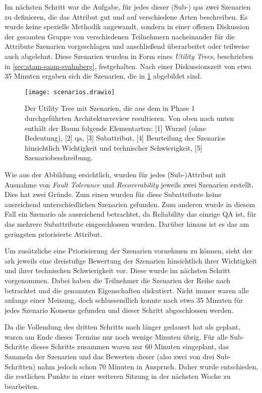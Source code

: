 Im nächsten Schritt war die Aufgabe, für jedes dieser (Sub-) \glspl{qa} zwei Szenarien zu definieren, die das Attribut gut und auf verschiedene Arten beschreiben.
Es wurde keine spezielle Methodik an\-ge\-wandt, sondern in einer offenen Diskussion der gesamten Gruppe von verschiedenen Teil\-neh\-mern nacheinander für die Attribute Szenarien vorgeschlagen und anschließend überarbeitet oder teilweise auch abgelehnt.
Diese Szenarien wurden in Form eines \emph{Utility Trees}, beschrieben in \cref{sec:atam-saam-svahnberg}, festgehalten.
Nach einer Diskussionszeit von etwa 35 Minuten ergaben sich die Szenarien, die in  \cref{fig:scenarios} abgebildet sind.

\begin{figure}
	\centering
	\texttt{[image: scenarios.drawio]}
	\caption[Utility Tree des Architekturreviews mit  und Szenarien]{
		Der Utility Tree mit Szenarien, die aus dem in Phase 1 durchgeführten Architekturreview resultieren.
		Von oben nach unten enthält der Baum folgende Elementarten: [1] Wurzel (ohne Bedeutung), [2] \gls{qa}, [3] Subattribut, [4] Be\-ur\-teilung des Szenarios hinsichtlich Wichtigkeit und technischer Schwierigkeit, [5] Szenariobeschreibung.
	}
	\label{fig:scenarios}
\end{figure}

Wie aus der Abbildung ersichtlich, wurden für jedes (Sub-)Attribut mit Ausnahme von \emph{Fault Tolerance} und \emph{Recoverability} jeweils zwei Szenarien erstellt.
Dies hat zwei Gründe.
Zum einen wurden für diese Subattribute keine ausreichend unterschiedlichen Szenarien gefunden.
Zum anderen wurde in diesem Fall ein Szenario als ausreichend betrachtet, da Reliability das einzige QA ist, für das mehrere Subattribute eingeschlossen wurden.
Darüber hinaus ist es das am geringsten priorisierte Attribut.

Um zusätzliche eine Priorisierung der Szenarien vornehmen zu können, sieht der \gls{arh} jeweils eine dreistufige Bewertung der Szenarien hinsichtlich ihrer Wichtigkeit und ihrer technischen Schwierigkeit vor.
Diese wurde im nächsten Schritt vorgenommen.
Dabei haben die Teilnehmer die Szenarien der Reihe nach betrachtet und die genannten Eigenschaften diskutiert.
Nicht immer waren alle anfangs einer Meinung, doch schlussendlich konnte nach etwa 35 Minuten für jedes Szenario Konsens gefunden und dieser Schritt abgeschlossen werden.

Da die Vollendung des dritten Schritts nach  länger gedauert hat als geplant, waren am Ende dieses Termins nur noch wenige Minuten übrig.
Für alle Sub-Schritte dieses Schritts zusammen waren nur 60 Minuten eingeplant, das Sammeln der Szenarien und das Bewerten dieser (also zwei von drei Sub-Schritten) nahm jedoch schon 70 Minuten in Anspruch.
Daher wurde entschieden, die restlichen Punkte in einer weiteren Sitzung in der nächsten Woche zu bearbeiten.

